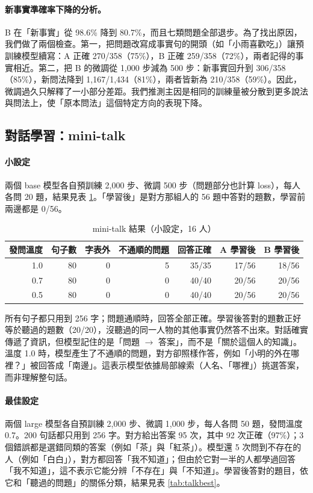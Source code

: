 \documentclass[11pt,a4paper]{article}
\begin{document}
\paragraph{新事實準確率下降的分析。}
B 在「新事實」從 98.6\% 降到 80.7\%，而且七類問題全部退步。為了找出原因，我們做了兩個檢查。第一，把問題改寫成事實句的開頭（如「小雨喜歡吃」）讓預訓練模型續寫：A 正確 270/358（75\%），B 正確 259/358（72\%），兩者記得的事實相近。第二，把 B 的微調從 1,000 步減為 500 步：新事實回升到 306/358（85\%），新問法降到 1,167/1,434（81\%），兩者皆新為 210/358（59\%）。因此，微調過久只解釋了一小部分差距。我們推測主因是相同的訓練量被分散到更多說法與問法上，使「原本問法」這個特定方向的表現下降。

\subsection{對話學習：mini-talk}

\paragraph{小設定} 兩個 base 模型各自預訓練 2,000 步、微調 500 步（問題部分也計算 loss），每人各問 20 題，結果見表 \ref{tab:talk}。「學習後」是對方那組人的 56 題中答對的題數，學習前兩邊都是 0/56。

\begin{table}[H]
\centering
\caption{mini-talk 結果（小設定，16 人）}\label{tab:talk}
\begin{tabular}{rrrrrrr}
\toprule
發問溫度 & 句子數 & 字表外 & 不通順的問題 & 回答正確 & A 學習後 & B 學習後 \\
\midrule
1.0 & 80 & 0 & 5 & 35/35 & 17/56 & 18/56 \\
0.7 & 80 & 0 & 0 & 40/40 & 20/56 & 20/56 \\
0.5 & 80 & 0 & 0 & 40/40 & 20/56 & 20/56 \\
\bottomrule
\end{tabular}
\end{table}

所有句子都只用到 256 字；問題通順時，回答全部正確。學習後答對的題數正好等於聽過的題數（20/20），沒聽過的同一人物的其他事實仍然答不出來。對話確實傳遞了資訊，但模型記住的是「問題 $\to$ 答案」，而不是「關於這個人的知識」。溫度 1.0 時，模型產生了不通順的問題，對方卻照樣作答，例如「小明的外在哪裡？」被回答成「南邊」。這表示模型依據局部線索（人名、「哪裡」）挑選答案，而非理解整句話。

\paragraph{最佳設定} 兩個 large 模型各自預訓練 2,000 步、微調 1,000 步，每人各問 50 題，發問溫度 0.7。200 句話都只用到 256 字。對方給出答案 95 次，其中 92 次正確（97\%）；3 個錯誤都是選錯同類的答案（例如「茶」與「紅茶」）。模型還 5 次問到不存在的人（例如「白白」），對方都回答「我不知道」；但由於它對一半的人都學過回答「我不知道」，這不表示它能分辨「不存在」與「不知道」。學習後答對的題目，依它和「聽過的問題」的關係分類，結果見表 \ref{tab:talkbest}。
\end{document}
